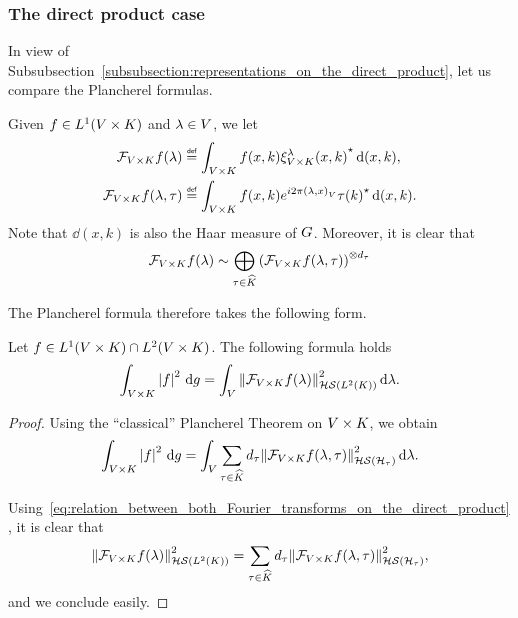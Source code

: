 \subsubsection{The direct product case}

In view of Subsubsection~\ref{subsubsection:representations_on_the_direct_product},
let us compare the Plancherel formulas.

Given $f \in \Lebesgue 1 {\GroupDirect}$ and $\lambda \in \VectorSpace$,
we let
\begin{align*}
    \Fourier [\GroupDirect] f(\lambda)
    &\defeq \int_{\GroupDirect} f(x, k) \adj{\Rep [\GroupDirect] \lambda(x, k)} \dd (x, k),\\
    \Fourier [\GroupDirect] f(\lambda, \tau)
    &\defeq \int_{\GroupDirect} f(x, k) \e^{\i \turn \ip \lambda x} \adj{\tau(k)} \dd (x, k).
\end{align*}
Note that $\dd (x, k)$ is also the Haar measure of $\Group$.
Moreover,
it is clear that
\begin{align}
    \Fourier [\GroupDirect] f(\lambda)
    \sim \bigoplus_{\tau \in \dualGroup \CompactGroup} \left(\Fourier [\GroupDirect] f(\lambda, \tau)\right)^{\otimes \dimRep \tau}
    \label{eq:relation_between_both_Fourier_transforms_on_the_direct_product}
\end{align}

The Plancherel formula therefore takes the following form.

\begin{proposition}
    Let $f \in \Lebesgue{1}{\GroupDirect} \cap \Lebesgue{2}{\GroupDirect}$.
    The following formula holds
    \begin{align}
        \int_{\GroupDirect} \abs{f}^2 \dd g = \int_\VectorSpace \norm[\HilbertSchmidt{\Lebesgue{2}{\CompactGroup}}]{\Fourier [\GroupDirect] {f}(\lambda)}^2 \dd \lambda.
    \end{align}
\end{proposition}
\begin{proof}
    Using the ``classical'' Plancherel Theorem on $\GroupDirect$,
    we obtain
    \begin{align*}
        \int_{\GroupDirect} \abs f^2 \dd g
        = \int_\VectorSpace \sum_{\tau \in \dualGroup \CompactGroup} \dimRep \tau \norm [\HilbertSchmidt {\mathcal H_\tau}] {\Fourier [\GroupDirect] f(\lambda, \tau)}^2 \dd \lambda.
    \end{align*}

    Using~\eqref{eq:relation_between_both_Fourier_transforms_on_the_direct_product},
    it is clear that
    \begin{align*}
        \norm [\HilbertSchmidt {\Lebesgue 2 \CompactGroup}] {\Fourier [\GroupDirect] f(\lambda)}^2
        = \sum_{\tau \in \dualGroup \CompactGroup} \dimRep \tau \norm [\HilbertSchmidt {\mathcal H_\tau}] {\Fourier [\GroupDirect] f(\lambda, \tau)}^2,
    \end{align*}
    and we conclude easily.
\end{proof}

